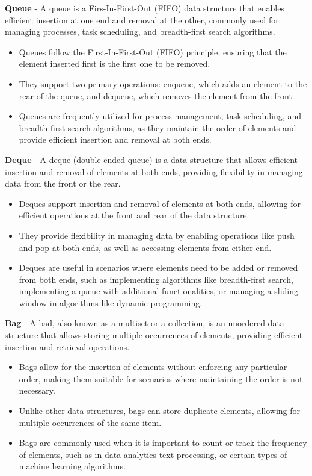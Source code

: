\begin{solution}
    \noindent \textbf{Queue} - A queue is a Firs-In-First-Out (FIFO) data structure that enables efficient insertion at one end and removal at the other, commonly used for managing
    processes, task scheduling, and breadth-first search algorithms.
    \begin{itemize}
        \item Queues follow the First-In-First-Out (FIFO) principle, ensuring that the element inserted first is the first one to be removed.
        \item They support two primary operations: enqueue, which adds an element to the rear of the queue, and dequeue, which removes the element from the front.
        \item Queues are frequently utilized for process management, task scheduling, and breadth-first search algorithms, as they maintain the order of elements and provide efficient
        insertion and removal at both ends.
    \end{itemize}

    \noindent \textbf{Deque} - A deque (double-ended queue) is a data structure that allows efficient insertion and removal of elements at both ends, providing flexibility in managing
    data from the front or the rear.
    \begin{itemize}
        \item Deques support insertion and removal of elements at both ends, allowing for efficient operations at the front and rear of the data structure.
        \item They provide flexibility in managing data by enabling operations like push and pop at both ends, as well as accessing elements from either end.
        \item Deques are useful in scenarios where elements need to be added or removed from both ends, such as implementing algorithms like breadth-first search, implementing a queue
        with additional functionalities, or managing a sliding window in algorithms like dynamic programming.
    \end{itemize}

    \noindent \textbf{Bag} - A bad, also known as a multiset or a collection, is an unordered data structure that allows storing multiple occurrences of elements, providing efficient
    insertion and retrieval operations.
    \begin{itemize}
        \item Bags allow for the insertion of elements without enforcing any particular order, making them suitable for scenarios where maintaining the order is not necessary.
        \item Unlike other data structures, bags can store duplicate elements, allowing for multiple occurrences of the same item.
        \item Bags are commonly used when it is important to count or track the frequency of elements, such as in data analytics text processing, or certain types of machine learning
        algorithms.
    \end{itemize}


\end{solution}
